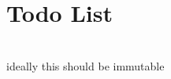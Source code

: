 \chapter{Todo List }
\hypertarget{todo}{}\label{todo}

\begin{DoxyRefList}
\item[{\parbox[t]{\linewidth}{Struct \doxylink{structNeoN_1_1la_1_1SparsityView}{NeoN\+::la\+::Sparsity\+View\texorpdfstring{$<$}{<} Index\+Type \texorpdfstring{$>$}{>}} }}]\hfill \\
\label{todo__todo000001}%
%
ideally this should be immutable 
\end{DoxyRefList}